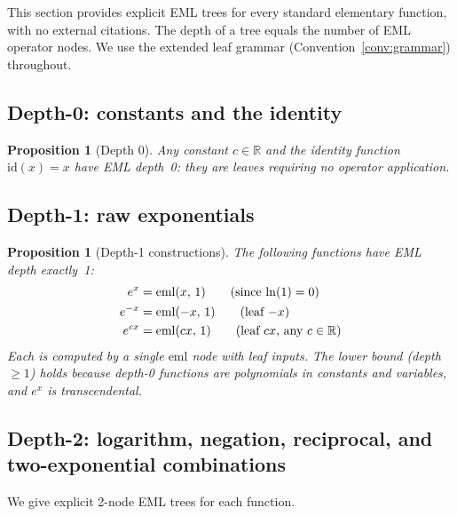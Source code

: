 \documentclass[12pt,a4paper]{article}
\newtheorem{proposition}[theorem]{Proposition}
\theoremstyle{definition}
\theoremstyle{remark}
\begin{document}
This section provides explicit EML trees for every standard elementary function,
with no external citations.  The depth of a tree equals the number of EML operator
nodes.  We use the extended leaf grammar (Convention~\ref{conv:grammar}) throughout.

\subsection{Depth-0: constants and the identity}

\begin{proposition}[Depth 0]\label{prop:d0}
Any constant $c \in \mathbb{R}$ and the identity function $\mathrm{id}(x) = x$
have EML depth~0: they are leaves requiring no operator application.
\end{proposition}

\subsection{Depth-1: raw exponentials}

\begin{proposition}[Depth-1 constructions]\label{prop:d1}
The following functions have EML depth exactly~1:
\begin{align}
  e^x        &= \mathrm{eml}(x,\, 1) \tag{since $\ln(1)=0$} \\
  e^{-x}     &= \mathrm{eml}(-x,\, 1) \tag{leaf $-x$} \\
  e^{cx}     &= \mathrm{eml}(cx,\, 1) \tag{leaf $cx$, any $c \in \mathbb{R}$}
\end{align}
Each is computed by a single $\mathrm{eml}$ node with leaf inputs.
The lower bound (depth $\geq 1$) holds because depth-0 functions are polynomials
in constants and variables, and $e^x$ is transcendental.
\end{proposition}

\subsection{Depth-2: logarithm, negation, reciprocal, and two-exponential combinations}

We give explicit 2-node EML trees for each function.
\end{document}

